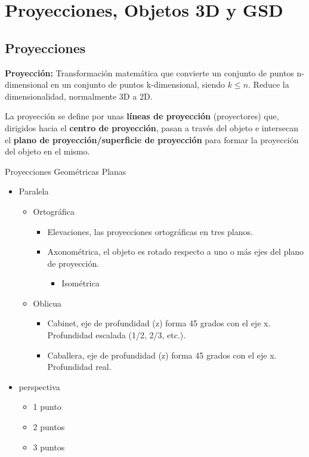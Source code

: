 \chapter{Proyecciones, Objetos 3D y GSD}
\section{Proyecciones}
\textbf{Proyección:} Transformación matemática que convierte un conjunto de puntos n-dimensional en un conjunto de puntos k-dimensional, siendo $k \leq n$. Reduce la dimensionalidad, normalmente 3D a 2D.

La proyección se define por unas \textbf{líneas de proyección} (proyectores) que, dirigidos hacia el \textbf{centro de proyección}, pasan a través del objeto e intersecan el \textbf{plano de proyección/superficie de proyección} para formar la proyección del objeto en el mismo.

Proyecciones Geométricas Planas
\begin{itemize}
	\item Paralela
	      \begin{itemize}
		      \item Ortográfica
		            \begin{itemize}
			            \item Elevaciones, las proyecciones ortográficas en tres planos.
			            \item Axonométrica, el objeto es rotado respecto a uno o más ejes del plano de proyección.
			                  \begin{itemize}
				                  \item Isométrica
			                  \end{itemize}
		            \end{itemize}
		      \item Oblicua
		            \begin{itemize}
			            \item Cabinet, eje de profundidad (z) forma 45 grados con el eje x. Profundidad escalada (1/2, 2/3, etc.).
			            \item Caballera, eje de profundidad (z) forma 45 grados con el eje x. Profundidad real.
		            \end{itemize}
	      \end{itemize}
	\item perspectiva
	      \begin{itemize}
		      \item 1 punto
		      \item 2 puntos
		      \item 3 puntos
	      \end{itemize}
\end{itemize}

